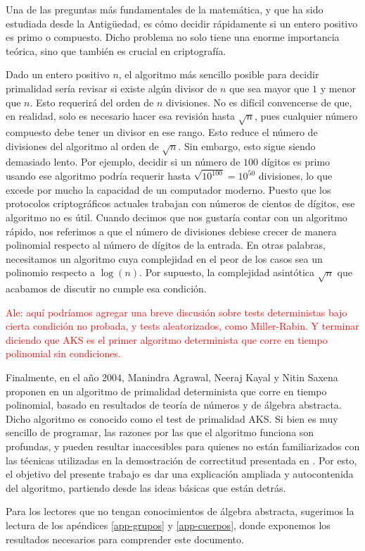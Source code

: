 Una de las preguntas más fundamentales de la matemática, y que ha sido estudiada desde la Antigüedad, es cómo decidir rápidamente si un entero positivo es primo o compuesto. Dicho problema no solo tiene una enorme importancia teórica, sino que también es crucial en criptografía.

Dado un entero positivo $n$, el algoritmo más sencillo posible para decidir primalidad sería revisar si existe algún divisor de $n$ que sea mayor que $1$ y menor que $n$. Esto requerirá del orden de $n$ divisiones. No es difícil convencerse de que, en realidad, solo es necesario hacer esa revisión hasta $\sqrt{n}$, pues cualquier número compuesto debe tener un divisor en ese rango. Esto reduce el número de divisiones del algoritmo al orden de $\sqrt{n}$. Sin embargo, esto sigue siendo demasiado lento. Por ejemplo, decidir si un número de $100$ dígitos es primo usando ese algoritmo podría requerir hasta $\sqrt{10^{100}} = 10^{50}$ divisiones, lo que excede por mucho la capacidad de un computador moderno. Puesto que los protocolos criptográficos actuales trabajan con números de cientos de dígitos, ese algoritmo no es útil. Cuando decimos que nos gustaría contar con un algoritmo rápido, nos referimos a que el número de divisiones debiese crecer de manera polinomial respecto al número de dígitos de la entrada. En otras palabras, necesitamos un algoritmo cuya complejidad en el peor de los casos sea un polinomio respecto a $\log(n)$. Por supuesto, la complejidad asintótica $\sqrt{n}$ que acabamos de discutir no cumple esa condición.


\textcolor{red}{Ale: aquí podríamos agregar una breve discusión sobre tests deterministas bajo cierta condición no probada, y tests aleatorizados, como Miller-Rabin. Y terminar diciendo que AKS es el primer algoritmo determinista que corre en tiempo polinomial sin condiciones.}


Finalmente, en el año 2004, Manindra Agrawal, Neeraj Kayal y Nitin Saxena proponen en \cite{AKS04} un algoritmo de primalidad determinista que corre en tiempo polinomial, basado en resultados de teorí­a de números y de álgebra abstracta. Dicho algoritmo es conocido como el test de primalidad AKS. Si bien es muy sencillo de programar, las razones por las que el algoritmo funciona son profundas, y pueden resultar inaccesibles para quienes no están familiarizados con las técnicas utilizadas en la demostración de correctitud presentada en \cite{AKS04}. Por esto, el objetivo del presente trabajo es dar una explicación ampliada y autocontenida del algoritmo, partiendo desde las ideas básicas que están detrás.

Para los lectores que no tengan conocimientos de álgebra abstracta, sugerimos la lectura de los apéndices \ref{app-grupos} y \ref{app-cuerpos}, donde exponemos los resultados necesarios para comprender este documento.